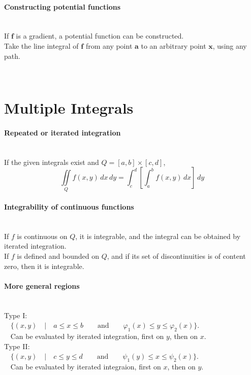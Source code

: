 \documentclass[10pt]{article}
\newcommand{\bs}[1]{\pmb{#1}}
\begin{document}
\paragraph{Constructing potential functions}\ \\
If $\bs{f}$ is a gradient, a potential function can be constructed.\\
Take the line integral of $\bs{f}$ from any point $\bs{a}$ to an arbitrary point $\bs{x}$, using any path.



\bigskip\bigskip\
\section{Multiple Integrals}\smallskip

\paragraph{Repeated or iterated integration}\ \\
If the given integrals exist and $Q = [a,b] \times [c,d]$,
\begin{equation*}
\iint\limits_Q f(x,y)\,dx\,dy = \int_c^d\left[\int_a^b f(x,y)\,dx\right]\,dy
\end{equation*}

\paragraph{Integrability of continuous functions}\ \\
If $f$ is continuous on $Q$, it is integrable, and the integral can be obtained by iterated integration.\\
If $f$ is defined and bounded on $Q$, and if its set of discontinuities is of content zero, then it is integrable.

\paragraph{More general regions}\ \\
Type I:\\
$\phantom{x}$ $\{(x,y)\quad | \quad a \leq x \leq b \qquad \text{and} \qquad \varphi_1(x) \leq y \leq \varphi_2(x)\}$.\\
$\phantom{x}$ Can be evaluated by iterated integration, first on $y$, then on $x$.\\
Type II:\\
$\phantom{x}$ $\{(x,y)\quad | \quad c \leq y \leq d \qquad \text{and} \qquad \psi_1(y) \leq x \leq \psi_2(x)\}$.\\
$\phantom{x}$ Can be evaluated by iterated integraion, first on $x$, then on $y$.
\end{document}
